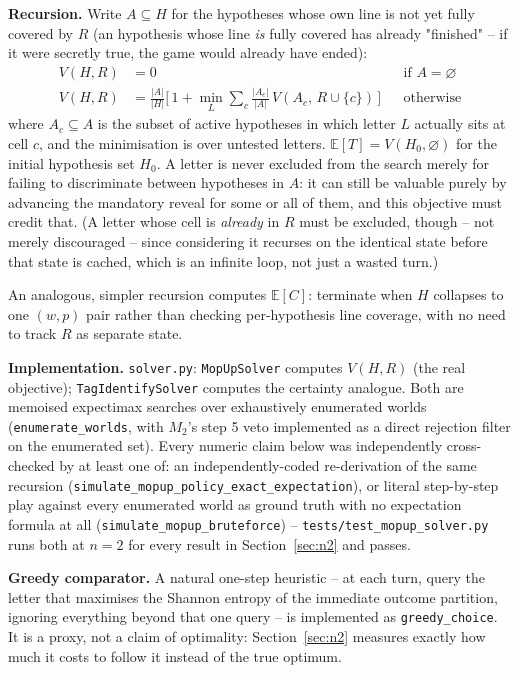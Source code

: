 \documentclass[11pt]{article}
\begin{document}
\textbf{Recursion.} Write $A \subseteq H$ for the hypotheses whose own
line is not yet fully covered by $R$ (an hypothesis whose line \emph{is}
fully covered has already "finished" -- if it were secretly true, the
game would already have ended):
\begin{align}
V(H,R) &= 0 && \text{if } A = \varnothing \\
V(H,R) &= \frac{|A|}{|H|}\Big[\,1 + \min_{L} \sum_{c} \frac{|A_c|}{|A|}\, V(A_c,\, R\cup\{c\})\,\Big] && \text{otherwise}
\end{align}
where $A_c \subseteq A$ is the subset of active hypotheses in which
letter $L$ actually sits at cell $c$, and the minimisation is over
untested letters. $\mathbb{E}[T] = V(H_0, \varnothing)$ for the initial
hypothesis set $H_0$. A letter is never excluded from the search merely
for failing to discriminate between hypotheses in $A$: it can still be
valuable purely by advancing the mandatory reveal for some or all of
them, and this objective must credit that. (A letter whose cell is
\emph{already} in $R$ must be excluded, though -- not merely discouraged
-- since considering it recurses on the identical state before that state
is cached, which is an infinite loop, not just a wasted turn.)

An analogous, simpler recursion computes $\mathbb{E}[C]$: terminate when
$H$ collapses to one $(w,p)$ pair rather than checking per-hypothesis
line coverage, with no need to track $R$ as separate state.

\textbf{Implementation.} \texttt{solver.py}: \texttt{MopUpSolver} computes
$V(H,R)$ (the real objective); \texttt{TagIdentifySolver} computes the
certainty analogue. Both are memoised expectimax searches over
exhaustively enumerated worlds (\texttt{enumerate\_worlds}, with $M_2$'s
step 5 veto implemented as a direct rejection filter on the enumerated
set). Every numeric claim below was independently cross-checked by at
least one of: an independently-coded re-derivation of the same recursion
(\texttt{simulate\_mopup\_policy\_exact\_expectation}), or literal
step-by-step play against every enumerated world as ground truth with no
expectation formula at all (\texttt{simulate\_mopup\_bruteforce}) --
\texttt{tests/test\_mopup\_solver.py} runs both at $n=2$ for every result
in Section~\ref{sec:n2} and passes.

\textbf{Greedy comparator.} A natural one-step heuristic -- at each turn,
query the letter that maximises the Shannon entropy of the immediate
outcome partition, ignoring everything beyond that one query -- is
implemented as \texttt{greedy\_choice}. It is a proxy, not a claim of
optimality: Section~\ref{sec:n2} measures exactly how much it costs to
follow it instead of the true optimum.
\end{document}
